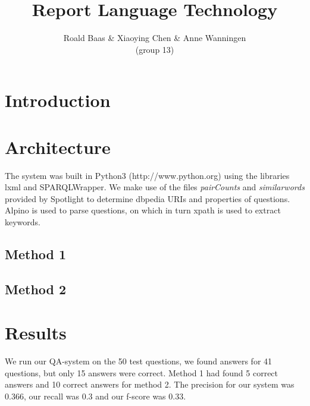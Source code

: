 \documentclass[a4paper,11pt]{article}
\title{Report Language Technology}
\author{Roald Baas \& Xiaoying Chen \& Anne Wanningen\\(group 13)}
\begin{document}


\maketitle

\section{Introduction}



\section{Architecture}
The system was built in Python3 (http://www.python.org) using the libraries lxml and SPARQLWrapper. We make use of the files \emph{pairCounts} and \emph{similarwords} provided by Spotlight \citep{isem2013daiber} to determine dbpedia URIs and properties of questions. Alpino is used to parse questions, on which in turn xpath is used to extract keywords.



\subsection{Method 1}


\subsection{Method 2}



\section{Results}
We run our QA-system on the 50 test questions, we found answers for 41 questions, but only 15 answers were correct. Method 1 had found 5 correct answers and 10 correct answers for method 2. The precision for our system was 0.366, our recall was 0.3 and our f-score was 0.33.
\end{document}
